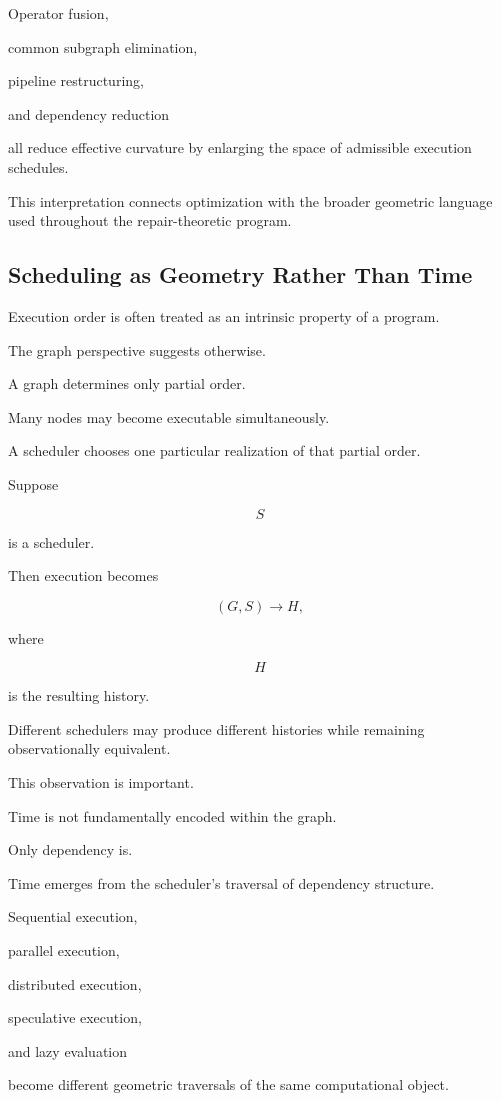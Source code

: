 \documentclass[12pt,oneside]{article}
\begin{document}
Operator fusion,

common subgraph elimination,

pipeline restructuring,

and dependency reduction

all reduce effective curvature by enlarging the space of admissible execution schedules.

This interpretation connects optimization with the broader geometric language used throughout the repair-theoretic program.

\subsection{Scheduling as Geometry Rather Than Time}

Execution order is often treated as an intrinsic property of a program.

The graph perspective suggests otherwise.

A graph determines only partial order.

Many nodes may become executable simultaneously.

A scheduler chooses one particular realization of that partial order.

Suppose

\[
S
\]

is a scheduler.

Then execution becomes

\[
(G,S)
\longrightarrow
H,
\]

where

\[
H
\]

is the resulting history.

Different schedulers may produce different histories while remaining observationally equivalent.

This observation is important.

Time is not fundamentally encoded within the graph.

Only dependency is.

Time emerges from the scheduler's traversal of dependency structure.

Sequential execution,

parallel execution,

distributed execution,

speculative execution,

and lazy evaluation

become different geometric traversals of the same computational object.
\end{document}

